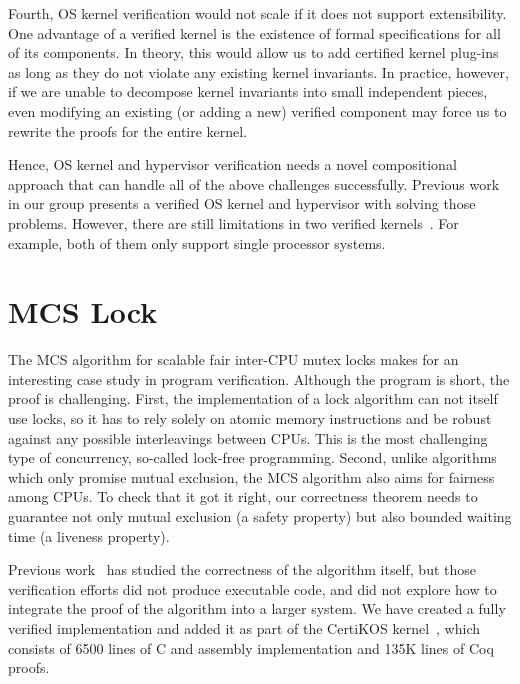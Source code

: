 Fourth, OS kernel verification would not scale if it does not  support extensibility.
One advantage of a verified kernel is the existence of formal specifications for all of its components. 
In theory, this would allow us to add certified kernel plug-ins as long as they do not violate any existing kernel invariants.
In practice, however, if we are unable to decompose kernel invariants into small independent pieces, even modifying an existing (or adding a new) verified component may force us to rewrite the proofs for the entire kernel.

Hence, OS kernel and hypervisor verification needs a novel compositional approach that can handle all of the above challenges successfully. 
Previous work~\cite{dscal15} in our group presents a verified OS kernel and hypervisor with solving those problems. 
However, there are still limitations in two verified kernels~\cite{dscal15, klein2009sel4}.
For example, both of them only support single processor systems.




\section{MCS Lock}

The MCS algorithm for scalable fair inter-CPU mutex locks makes for an interesting case study in program verification.
Although the program is short, the proof is challenging.
First, the implementation of a lock algorithm can not itself use locks, so it has to rely solely on atomic memory instructions and be robust against any possible interleavings between CPUs. This is the most challenging type of concurrency, so-called lock-free programming.
Second, unlike algorithms which only promise mutual exclusion, the MCS algorithm also aims for fairness among CPUs. To check that it got it right, our correctness theorem needs to guarantee not only mutual exclusion (a safety property) but also bounded waiting time (a liveness property).

Previous work~\cite{liang:lili,ogata:mcs-lock} has studied the
correctness of the algorithm itself, but those verification efforts
did not produce executable code, and did not explore how to integrate
the proof of the algorithm into a larger system. We have created a
fully verified implementation and added it as part of the CertiKOS
kernel~\cite{certikos16}, which consists of 6500 lines of C and
assembly implementation and 135K lines of Coq proofs.

